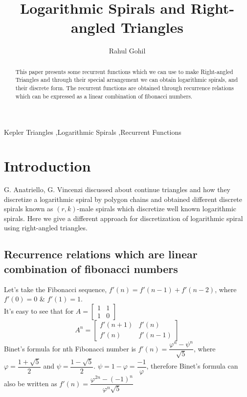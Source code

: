 \documentclass[preprint,12pt]{elsarticle}
\begin{document}
\begin{frontmatter}
	
	\title{Logarithmic Spirals and Right-angled Triangles}
	
	\author{Rahul Gohil}
	
	\address{Student, B.E(Computer Engineering), Thadomal Shahani Engineering College, Mumbai, India}
	\begin{abstract}
		This paper presents some recurrent functions which we can use to make Right-angled Triangles and through their special arrangement we can obtain logarithmic spirals, and their discrete form. The recurrent functions are obtained through recurrence relations which can be expressed as a linear combination of fibonacci numbers.  
	\end{abstract}
	
	\begin{keyword}
		Kepler Triangles \sep Logarithmic Spirals \sep Recurrent Functions
	\end{keyword}
	
\end{frontmatter}

\section{Introduction}
G. Anatriello, G. Vincenzi\cite{paper1} discussed about continue triangles and how they discretize a logarithmic spiral by polygon chains and obtained different discrete spirals known as $(r, k)$-male spirals which discretize well known logarithmic spirals. Here we give a different approach for discretization of logarithmic spiral using right-angled triangles.
\subsection{Recurrence relations which are linear combination of fibonacci numbers}
\label{recurr}
Let's take the Fibonacci sequence, $f'(n) = f'(n - 1) + f'(n - 2)$, where $f'(0) = 0$ \& $f'(1) = 1$.\\
It's easy to see that for $A  = \begin{bmatrix}1 & 1 \\ 1 & 0 \end{bmatrix}$ $$A^n = \begin{bmatrix}f'(n + 1) & f'(n) \\ f'(n) & f'(n - 1)\end{bmatrix}$$
Binet's formula for nth Fibonacci number is $f'(n) = \dfrac{\varphi^n - \psi^n}{\sqrt{5}}$, where $\varphi = \dfrac{1 + \sqrt{5}}{2}$ and $\psi = \dfrac{1 - \sqrt{5}}{2}$\cite{Fn-wiki}.
$\psi = 1 - \varphi = \dfrac{-1}{\varphi}$, therefore Binet's formula can also be written as 
$f'(n) = \dfrac{\varphi^{2n} - (-1)^n}{\varphi^n\sqrt{5}}$\\
\end{document}
